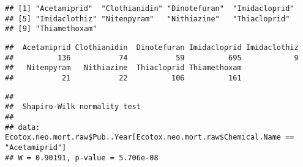 \documentclass[]{article}
\newenvironment{Shaded}{\begin{snugshade}}{\end{snugshade}}
\newcommand{\KeywordTok}[1]{\textcolor[rgb]{0.13,0.29,0.53}{\textbf{#1}}}
\newcommand{\StringTok}[1]{\textcolor[rgb]{0.31,0.60,0.02}{#1}}
\newcommand{\CommentTok}[1]{\textcolor[rgb]{0.56,0.35,0.01}{\textit{#1}}}
\newcommand{\OperatorTok}[1]{\textcolor[rgb]{0.81,0.36,0.00}{\textbf{#1}}}
\newcommand{\NormalTok}[1]{#1}
\begin{document}
\begin{Shaded}
\end{Shaded}

\begin{verbatim}
## [1] "Acetamiprid"  "Clothianidin" "Dinotefuran"  "Imidacloprid"
## [5] "Imidaclothiz" "Nitenpyram"   "Nithiazine"   "Thiacloprid" 
## [9] "Thiamethoxam"
\end{verbatim}

\begin{Shaded}
\end{Shaded}

\begin{verbatim}
##  Acetamiprid Clothianidin  Dinotefuran Imidacloprid Imidaclothiz 
##          136           74           59          695            9 
##   Nitenpyram   Nithiazine  Thiacloprid Thiamethoxam 
##           21           22          106          161
\end{verbatim}

\begin{Shaded}
\end{Shaded}

\begin{verbatim}
## 
##  Shapiro-Wilk normality test
## 
## data:  Ecotox.neo.mort.raw$Pub..Year[Ecotox.neo.mort.raw$Chemical.Name ==     "Acetamiprid"]
## W = 0.90191, p-value = 5.706e-08
\end{verbatim}

\begin{Shaded}
\end{Shaded}
\end{document}

